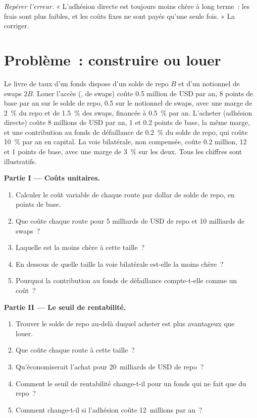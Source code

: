 \begin{exercise}[$\star\star\star$]\label{exo:m2:getting-access-rates-credit:8}
\emph{Repérer l'erreur.} « L'adhésion directe est toujours moins chère à long terme~: les frais
sont plus faibles, et les coûts fixes ne sont payés qu'une seule fois. » La corriger.
\end{exercise}

\section{Problème~: construire ou louer}

\begin{problem}\label{pb:m2:getting-access-rates-credit:1}
Le livre de taux d'un fonds dispose d'un solde de repo $B$ et d'un notionnel de swaps $2B$. Louer l'accès
(,  de swaps) coûte 0.5 million de USD par an, 8 points de base
par an sur le solde de repo, 0.5 sur le notionnel de swaps, avec une marge de 2~\% du repo et de 1.5~\%
des swaps, financée à 0.5~\% par an. L'acheter (adhésion directe) coûte 8 millions de USD
par an, 1 et 0.2 points de base, la même marge, et une contribution au fonds de défaillance de 0.2~\%
du solde de repo, qui coûte 10~\% par an en capital. La voie bilatérale, non compensée, coûte 0.2
million, 12 et 1 points de base, avec une marge de 3~\% sur les deux. Tous les chiffres sont illustratifs.

\medskip\noindent\textbf{Partie I --- Coûts unitaires.}
\begin{enumerate}
\item Calculer le coût variable de chaque route par dollar de solde de repo, en points de base.
\item Que coûte chaque route pour 5 milliards de USD de repo et 10 milliards de swaps~?
\item Laquelle est la moins chère à cette taille~?
\item En dessous de quelle taille la voie bilatérale est-elle la moins chère~?
\item Pourquoi la contribution au fonds de défaillance compte-t-elle comme un coût~?
\end{enumerate}

\medskip\noindent\textbf{Partie II --- Le seuil de rentabilité.}
\begin{enumerate}[resume]
\item Trouver le solde de repo au-delà duquel acheter est plus avantageux que louer.
\item Que coûte chaque route à cette taille~?
\item Qu'économiserait l'achat pour 20~milliards de USD de repo~?
\item Comment le seuil de rentabilité change-t-il pour un fonds qui ne fait que du repo~?
\item Comment change-t-il si l'adhésion coûte 12~millions par an~?
\end{enumerate}


\end{problem}
